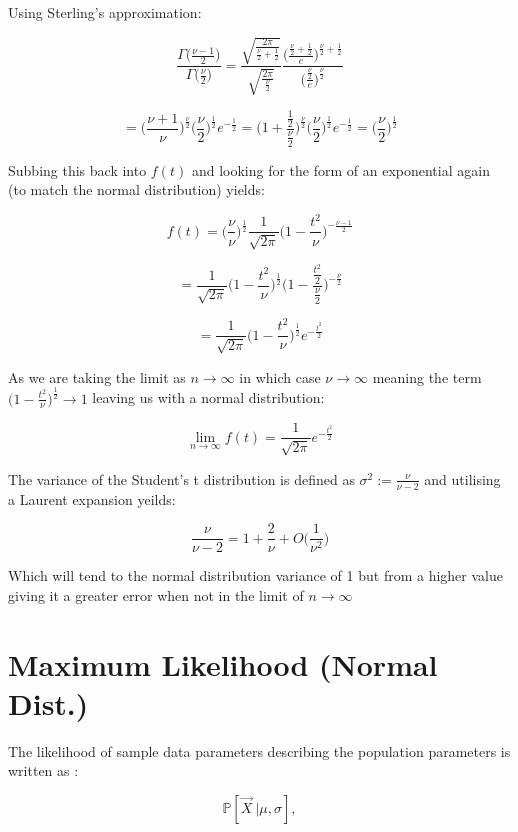 \documentclass[a4paper,12pt,notitlepage]{article}
\begin{document}
Using Sterling's approximation:

$$\frac{\Gamma{\big(\frac{\nu - 1}{2}}\big)}{\Gamma{\big(\frac{\nu}{2}}\big)} = \frac{\sqrt{\frac{2\pi}{\frac{\nu}{2}+\frac{1}{2}}}}{\sqrt{\frac{2\pi}{\frac{\nu}{2}}}}  
 \frac{\bigg(\frac{\frac{\nu}{2}+\frac{1}{2}}{e}\bigg)^{\frac{\nu}{2}+\frac{1}{2}}}{\bigg(\frac{\frac{\nu}{2}}{e}\bigg)^{\frac{\nu}{2}}}$$

$$=\bigg(\frac{\nu+1}{\nu}\bigg)^{\frac{\nu}{2}} \bigg(\frac{\nu}{2}\bigg)^{\frac{1}{2}} e^{-\frac{1}{2}} = \bigg(1+\frac{\frac{1}{2}}{\frac{\nu}{2}}\bigg)^{\frac{\nu}{2}} \bigg(\frac{\nu}{2}\bigg)^{\frac{1}{2}} e^{-\frac{1}{2}} = \bigg(\frac{\nu}{2}\bigg)^{\frac{1}{2}}$$

Subbing this back into $f(t)$ and looking for the form of an exponential again (to match the normal distribution) yields:

$$f(t) = \bigg(\frac{\nu}{\nu}\bigg)^{\frac{1}{2}} \frac{1}{\sqrt{2\pi}} \bigg(1-\frac{t^2}{\nu}\bigg)^{-\frac{\nu-1}{2}}$$

$$ = \frac{1}{\sqrt{2\pi}} \bigg(1-\frac{t^2}{\nu}\bigg)^{\frac{1}{2}} \bigg(1-\frac{\frac{t^2}{2}}{\frac{\nu}{2}}\bigg)^{-\frac{\nu}{2}}$$ 

$$ = \frac{1}{\sqrt{2\pi}} \bigg(1-\frac{t^2}{\nu}\bigg)^{\frac{1}{2}} e^{-\frac{t^2}{2}}$$

As we are taking the limit as $n \rightarrow \infty$ in which case $ \nu \rightarrow \infty$ meaning the term $\bigg(1-\frac{t^2}{\nu}\bigg)^{\frac{1}{2}} \rightarrow 1$ leaving us with a normal distribution:

$$ \lim_{n \to \infty} f(t) = \frac{1}{\sqrt{2\pi}} e^{-\frac{t^2}{2}}$$

The variance of the Student's t distribution is defined as $\sigma^2 := \frac{\nu}{\nu-2}$ and utilising a Laurent expansion yeilds:

$$ \frac{\nu}{\nu-2} = 1+ \frac{2}{\nu}+ O\bigg(\frac{1}{\nu^2}\bigg)$$

Which will tend to the normal distribution variance of 1 but from a higher value giving it a greater error when not in the limit of $n \to \infty$

\section{Maximum Likelihood (Normal Dist.)}

The likelihood of sample data parameters describing the population parameters is written as :

$$ \mathbb{P}[\Vec{X}\ |  \mu ,\sigma   ], $$
\end{document}
